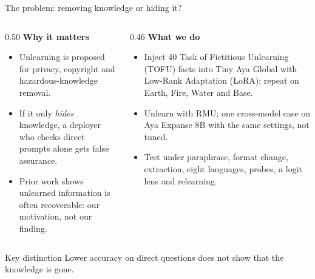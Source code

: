 \documentclass[aspectratio=169,11pt,usepdftitle=false]{beamer}
\begin{document}
\begin{frame}{The problem: removing knowledge or hiding it?}
\footnotesize
\begin{columns}[T]
\begin{column}{0.50\textwidth}
\textbf{Why it matters}
\begin{itemize}
\item Unlearning is proposed for privacy, copyright and hazardous-knowledge removal.
\item If it only \emph{hides} knowledge, a deployer who checks direct prompts alone gets false assurance.
\item Prior work shows unlearned information is often recoverable: our motivation, not our finding.
\end{itemize}
\end{column}
\begin{column}{0.46\textwidth}
\textbf{What we do}
\begin{itemize}
\item Inject 40 Task of Fictitious Unlearning (TOFU) facts into Tiny Aya Global with Low-Rank Adaptation (LoRA); repeat on Earth, Fire, Water and Base.
\item Unlearn with RMU; one cross-model case on Aya Expanse 8B with the same settings, not tuned.
\item Test under paraphrase, format change, extraction, eight languages, probes, a logit lens and relearning.
\end{itemize}
\end{column}
\end{columns}
\begin{alertblock}{Key distinction}
Lower accuracy on direct questions does not show that the knowledge is gone.
\end{alertblock}
\end{frame}
\end{document}
